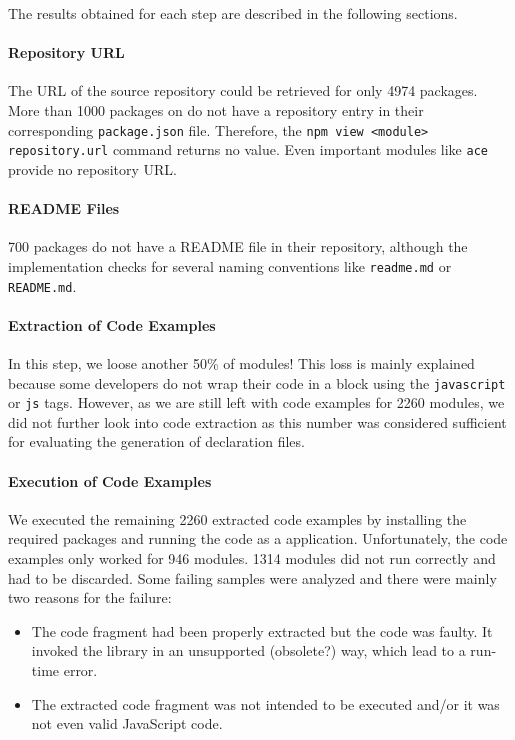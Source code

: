 \documentclass[english,cleveref,autoref,submission]{programming}
\begin{document}
The results obtained for each step are described in the
following sections. 

\paragraph*{Repository URL}
The URL of the source repository could be retrieved for only 4974
packages. More than 1000 packages on \NPM{} do not have a repository
entry in their corresponding \texttt{package.json} file. Therefore, the
\texttt{npm view <module> repository.url} command returns no
value. Even important modules like \texttt{ace} provide no repository URL.

\paragraph*{README Files}
700 packages do not have a README file in their repository, although
the implementation checks for several naming conventions like
\texttt{readme.md} or \texttt{README.md}. 

\paragraph*{Extraction of Code Examples}
In this step, we loose another 50\% of modules! This loss is mainly
explained because some developers do not wrap their code in a block
using the \texttt{javascript} or \texttt{js} tags. However, as we are
still left with code examples for 2260 modules, we did not further
look into code extraction as this number was considered sufficient for
evaluating the generation of declaration files. 

\paragraph*{Execution of Code Examples}
We executed the remaining 2260 extracted code examples by installing the
required packages and running the code as a \NodeJS{}
application. Unfortunately, the code examples only worked for 946
modules. 1314 modules did not run correctly and had to be
discarded. Some failing samples were analyzed and there were mainly
two reasons for the failure: 
\begin{itemize}
\item The code fragment had been properly extracted but the code was
  faulty. It invoked the library in an unsupported
  (obsolete?) way, which lead to a run-time error.
\item The extracted code fragment was not intended to be executed
  and/or it was not even valid JavaScript code. 
\end{itemize}
\end{document}
